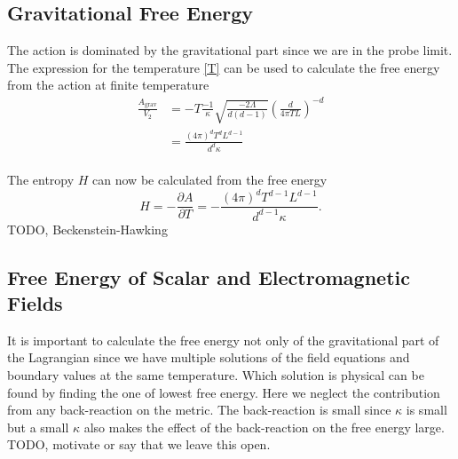\documentclass[12pt]{report}
\begin{document}
\subsection{Gravitational Free Energy}
The action is dominated by the gravitational part since we are in the probe limit. 
The expression for the temperature \eqref{T} can be used to calculate the free energy from the action at finite temperature
\begin{equation}
\begin{split}
 \frac{A_\mathrm{grav}}{V_2}&=-T\frac{-1}{\kappa}\sqrt{\frac{-2\Lambda}{d(d-1)}}\left(\frac{d}{4\pi TL}\right)^{-d}\\
&=\frac{(4\pi)^dT^dL^{d-1}}{d^{d}\kappa}
\end{split}
\end{equation}
\\
The entropy $H$ can now be calculated from the free energy
\begin{equation}
 H=-\frac{\partial A}{\partial T}=-\frac{(4\pi)^dT^{d-1}L^{d-1}}{d^{d-1}\kappa}.
\end{equation}
TODO, Beckenstein-Hawking
\subsection{Free Energy of Scalar and Electromagnetic Fields}
It is important to calculate the free energy not only of the gravitational part of the Lagrangian since we have multiple solutions of the field equations and boundary values at the same temperature. Which solution is physical can be found by finding the one of lowest free energy. Here we neglect the contribution from any back-reaction on the metric. The back-reaction is small since $\kappa$ is small but a small $\kappa$ also makes the effect of the back-reaction on the free energy large. TODO, motivate or say that we leave this open.\\
\end{document}
